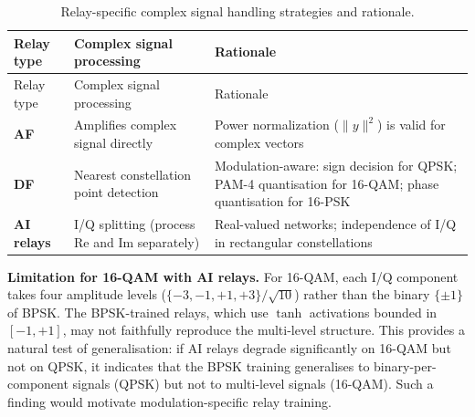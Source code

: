 \documentclass[
  english,
  12pt,
  12pt,
  a4paper,
  oneside]{report}
\begin{document}
\begin{longtable}[]{@{}
  >{\raggedright\arraybackslash}p{}
  >{\raggedright\arraybackslash}p{}
  >{\raggedright\arraybackslash}p{}@{}}
\caption{Relay-specific complex signal handling strategies and rationale.}\label{tbl:table31}\tabularnewline
\toprule\noalign{}
\begin{minipage}[b]{\linewidth}\raggedright
Relay type
\end{minipage} & \begin{minipage}[b]{\linewidth}\raggedright
Complex signal processing
\end{minipage} & \begin{minipage}[b]{\linewidth}\raggedright
Rationale
\end{minipage} \\
\midrule\noalign{}
\endfirsthead
\toprule\noalign{}
\begin{minipage}[b]{\linewidth}\raggedright
Relay type
\end{minipage} & \begin{minipage}[b]{\linewidth}\raggedright
Complex signal processing
\end{minipage} & \begin{minipage}[b]{\linewidth}\raggedright
Rationale
\end{minipage} \\
\midrule\noalign{}
\endhead
\bottomrule\noalign{}
\endlastfoot
\textbf{AF} & Amplifies complex signal directly & Power normalization (\(\|y\|^2\)) is valid for complex vectors \\
\textbf{DF} & Nearest constellation point detection & Modulation-aware: sign decision for QPSK; PAM-4 quantisation for 16-QAM; phase quantisation for 16-PSK \\
\textbf{AI relays} & I/Q splitting (process Re and Im separately) & Real-valued networks; independence of I/Q in rectangular constellations \\
\end{longtable}

\textbf{Limitation for 16-QAM with AI relays.} For 16-QAM, each I/Q component takes four amplitude levels (\(\{-3, -1, +1, +3\}/\sqrt{10}\)) rather than the binary \(\{\pm 1\}\) of BPSK. The BPSK-trained relays, which use \(\tanh\) activations bounded in \([-1, +1]\), may not faithfully reproduce the multi-level structure. This provides a natural test of generalisation: if AI relays degrade significantly on 16-QAM but not on QPSK, it indicates that the BPSK training generalises to binary-per-component signals (QPSK) but not to multi-level signals (16-QAM). Such a finding would motivate modulation-specific relay training.
\end{document}
